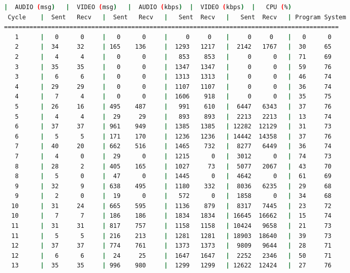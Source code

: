 \begin{adjustbox}{max width=\textwidth}
\begin{lstlisting}[language=bash,basicstyle=\ttfamily\scriptsize]
          |  AUDIO (msg)   |  VIDEO (msg)   |  AUDIO (kbps)  |  VIDEO (kbps)  |   CPU (%)
 Cycle    |  Sent   Recv   |  Sent   Recv   |   Sent  Recv   |   Sent  Recv   | Program System
============================================================================================
   1      |   0      0     |   0      0     |     0     0    |     0     0    |   0      0
   2      |  34     32     | 165    136     |  1293   1217   |  2142   1767   |  30     65
   2      |   4      4     |   0      0     |   853    853   |     0      0   |  71     69
   3      |  35     35     |   0      0     |  1347   1347   |     0      0   |  59     76
   3      |   6      6     |   0      0     |  1313   1313   |     0      0   |  46     74
   4      |  29     29     |   0      0     |  1107   1107   |     0      0   |  36     74
   4      |   7      4     |   0      0     |  1606    918   |     0      0   |  35     75
   5      |  26     16     | 495    487     |   991    610   |  6447   6343   |  37     76
   5      |   4      4     |  29     29     |   893    893   |  2213   2213   |  13     74
   6      |  37     37     | 961    949     |  1385   1385   | 12282  12129   |  31     73
   6      |   5      5     | 171    170     |  1236   1236   | 14442  14358   |  37     76
   7      |  40     20     | 662    516     |  1465    732   |  8277   6449   |  36     74
   7      |   4      0     |  29      0     |  1215      0   |  3012      0   |  74     73
   8      |  28      2     | 405    165     |  1027     73   |  5077   2067   |  43     70
   8      |   5      0     |  47      0     |  1445      0   |  4642      0   |  61     69
   9      |  32      9     | 638    495     |  1180    332   |  8036   6235   |  29     68
   9      |   2      0     |  19      0     |   572      0   |  1858      0   |  34     68
  10      |  31     24     | 665    595     |  1136    879   |  8317   7445   |  23     72
  10      |   7      7     | 186    186     |  1834   1834   | 16645  16662   |  15     74
  11      |  31     31     | 817    757     |  1158   1158   | 10424   9658   |  21     73
  11      |   5      5     | 216    213     |  1281   1281   | 18903  18640   |  39     73
  12      |  37     37     | 774    761     |  1373   1373   |  9809   9644   |  28     71
  12      |   6      6     |  24     25     |  1647   1647   |  2252   2346   |  50     71
  13      |  35     35     | 996    980     |  1299   1299   | 12622  12424   |  27     76

\end{lstlisting}
\end{adjustbox}
